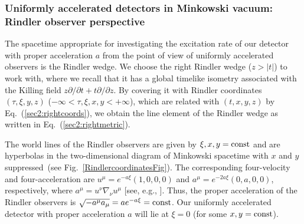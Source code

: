 \documentclass[12pt,nofootinbib,floatfix,aps,prd,showpacs,amsmath,amssymb,eqsecnum]{revtex4-2}
\begin{document}
\subsubsection{Uniformly accelerated detectors in Minkowski vacuum:
               Rindler observer perspective}
\label{subsubsection:uadRindler}
The spacetime appropriate for investigating
the excitation rate of our detector
with proper acceleration $a$ from the point of view of 
uniformly accelerated observers is the Rindler wedge. We choose the right 
Rindler wedge ($ z > |t| $) to work with, where we recall that it has 
a global timelike isometry associated with the Killing field 
$z \partial/\partial t + t \partial/\partial z$. 
By covering it with Rindler coordinates $(\tau,\xi, y, z)$
($-\infty<\tau, \xi, x, y <+\infty$), 
which are related with $(t,x,y,z)$ by Eq.~(\ref{sec2:rightcoords}), 
we obtain the line element of the Rindler wedge as written in 
Eq.~(\ref{sec2:rightmetric}).

The world lines of the Rindler observers are given 
by $\xi,x,y = {\rm const}$ and are hyperbolas 
in the two-dimensional diagram of Minkowski spacetime 
with $x$ and $y$ suppressed~(see Fig.~\ref{RindlercoordinatesFig}).
The corresponding four-velocity and four-acceleration 
are 
$u^\mu = e^{- a \xi}(1,0,0,0) $ 
and 
$a^\mu = e^{-2 a \xi }(0, a ,0,0)$,
respectively,
where $a^{\mu} = u^{\nu}\nabla_{\nu} u^{\mu}$ 
[see, e.g., \textcite{Waldbook84}]. Thus, the proper acceleration
of the Rindler observers is  
$\sqrt{-a^\mu a_\mu} = a e^{- a \xi}  = {\rm const}$.
Our uniformly accelerated detector 
with proper acceleration $a$ will lie 
at $\xi = 0$ (for some $x, y = {\rm const}$).
\end{document}
